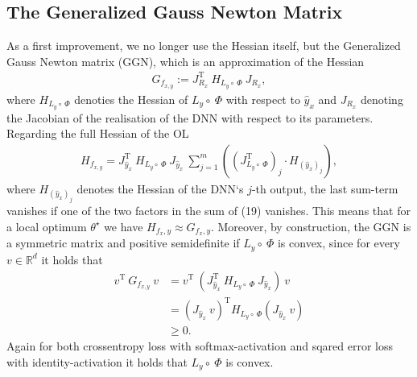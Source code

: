 \documentclass[conference]{IEEEtran}
\begin{document}
\subsection{The Generalized Gauss Newton Matrix}
As a first improvement, we no longer use the Hessian itself, but the Generalized Gauss Newton matrix (GGN), which is an approximation of the Hessian 
\begin{align}
G_{f_{x, y}} := J_{R_{x}}^{\mathrm{T}}\:H_{L_{y}\circ\:\Phi}\:J_{R_{x}},
\end{align}
where $H_{L_{y}\circ\:\Phi}$ denoties the Hessian of $L_{y}\circ\:\Phi$ with respect to $\hat{y}_{x}$ and $J_{R_{x}}$ denoting the Jacobian of the realisation of the DNN with respect to its parameters.
Regarding the full Hessian of the OL
\begin{align}
H_{f_{x, y}} = J_{\hat{y}_{x}}^{\mathrm{T}}\:H_{L_{y}\circ\:\Phi}\:J_{\hat{y}_{x}}\:\sum_{j = 1}^{m}\left(\left(J_{L_{y}\circ \:\Phi}^{\mathrm{T}}\right)_{j}\cdot H_{(\hat{y}_{x})_{j}}\right),
\end{align}
where $H_{(\hat{y}_{x})_{j}}$ denotes the Hessian of the DNN`s  $j$-th output, the last sum-term vanishes if one of the two factors in the sum of (19) vanishes.
This means that for a local optimum $\theta^{\star}$ we have $H_{f_x, y} \approx G_{f_x, y}$.   Moreover, by construction, the GGN is a symmetric matrix and positive semidefinite if $L_{y}\circ\:\Phi$ is convex, since for every $v\in\mathbb{R}^{d}$ it holds that
\begin{align}
v^{\mathrm{T}}\:G_{f_{x, y}}\:v &= v^{\mathrm{T}}\:\left( J_{\hat{y}_{x}}^{\mathrm{T}}\:H_{L_{y}\circ\:\Phi}\:J_{\hat{y}_{x}}\right)\:v\\
&= \left(J_{\hat{y}_{x}}\:v\right)^{\mathrm{T}}H_{L_{y}\circ\:\Phi}\left(J_{\hat{y}_{x}}\:v\right) \\
&\geq 0.
\end{align}
Again for both crossentropy loss with softmax-activation and sqared error loss with identity-activation it holds that $L_{y}\circ\:\Phi$ is convex.
\end{document}
